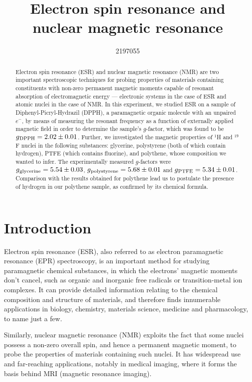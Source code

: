 \documentclass[a4paper]{jpconf}
\numberwithin{equation}{section}
\begin{document}
\title{Electron spin resonance and nuclear magnetic resonance}
\author{2197055}

\begin{abstract}
Electron spin resonance (ESR) and nuclear magnetic resonance (NMR) are two important spectroscopic techniques for probing properties of materials containing constituents with non-zero permanent magnetic moments capable of resonant absorption of electromagnetic energy --- electronic systems in the case of ESR and atomic nuclei in the case of NMR. In this experiment, we studied ESR on a sample of Diphenyl-Picryl-Hydrazil (DPPH), a paramagnetic organic molecule with an unpaired $e^-$, by means of measuring the resonant frequency as a function of externally applied magnetic field in order to determine the sample\textquoteright s $g$-factor, which was found to be $g\textsubscript{DPPH} = 2.02 \pm 0.01$.
Further, we investigated the magnetic properties of ${}^1$H and ${}^{19}$F nuclei in the following substances: glycerine, polystyrene (both of which contain hydrogen), PTFE (which contains fluorine), and polythene, whose composition we wanted to infer. The experimentally measured $g$-factors were $g\textsubscript{glycerine} = 5.54 \pm 0.03$, $g\textsubscript{polystyrene} = 5.68 \pm 0.01$ and $g\textsubscript{PTFE} = 5.34 \pm 0.01$. Comparison with the results obtained for polythene lead us to postulate the presence of hydrogen in our polythene sample, as confirmed by its chemical formula.
\end{abstract}

\section{Introduction}
Electron spin resonance (ESR), also referred to as electron paramagnetic resonance (EPR) spectroscopy,      %
is an important method for studying paramagnetic chemical substances, in which the electrons' magnetic moments don't cancel, such as organic and inorganic free radicals or transition-metal ion complexes. It can provide detailed information relating to the chemical composition and structure of materials, and therefore finds innumerable applications in biology, chemistry, materials science, medicine and pharmacology, to name just a few.

Similarly, nuclear magnetic resonance (NMR) exploits the fact that some nuclei possess a non-zero overall spin, and hence a permanent magnetic moment, to probe the properties of materials containing such nuclei. It has widespread use and far-reaching applications, notably in medical imaging, where it forms the basis behind MRI (magnetic resonance imaging).
\end{document}
